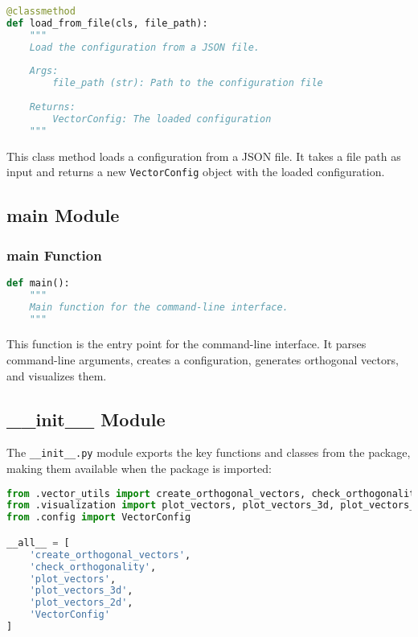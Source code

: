 \begin{lstlisting}[language=Python]
@classmethod
def load_from_file(cls, file_path):
    """
    Load the configuration from a JSON file.
    
    Args:
        file_path (str): Path to the configuration file
        
    Returns:
        VectorConfig: The loaded configuration
    """
\end{lstlisting}

This class method loads a configuration from a JSON file. It takes a file path as input and returns a new \texttt{VectorConfig} object with the loaded configuration.

\subsection{main Module}

\subsubsection{main Function}

\begin{lstlisting}[language=Python]
def main():
    """
    Main function for the command-line interface.
    """
\end{lstlisting}

This function is the entry point for the command-line interface. It parses command-line arguments, creates a configuration, generates orthogonal vectors, and visualizes them.

\subsection{\_\_init\_\_ Module}

The \texttt{\_\_init\_\_.py} module exports the key functions and classes from the package, making them available when the package is imported:

\begin{lstlisting}[language=Python]
from .vector_utils import create_orthogonal_vectors, check_orthogonality
from .visualization import plot_vectors, plot_vectors_3d, plot_vectors_2d
from .config import VectorConfig

__all__ = [
    'create_orthogonal_vectors',
    'check_orthogonality',
    'plot_vectors',
    'plot_vectors_3d',
    'plot_vectors_2d',
    'VectorConfig'
]
\end{lstlisting}
